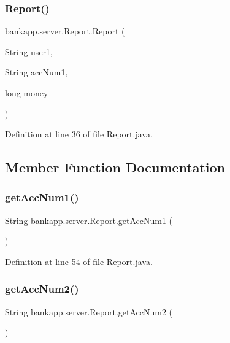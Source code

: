 \subsubsection{\texorpdfstring{Report()}{Report()}\hspace{0.1cm}{\footnotesize\ttfamily [3/3]}}
{\footnotesize\ttfamily bankapp.\+server.\+Report.\+Report (\begin{DoxyParamCaption}\item[{String}]{user1,  }\item[{String}]{acc\+Num1,  }\item[{long}]{money }\end{DoxyParamCaption})}



Definition at line 36 of file Report.\+java.



\subsection{Member Function Documentation}
\mbox{\label{classbankapp_1_1server_1_1_report_afe47b72f0f1624be2f77d0f573673fb3}} 
\subsubsection{\texorpdfstring{get\+Acc\+Num1()}{getAccNum1()}}
{\footnotesize\ttfamily String bankapp.\+server.\+Report.\+get\+Acc\+Num1 (\begin{DoxyParamCaption}{ }\end{DoxyParamCaption})}



Definition at line 54 of file Report.\+java.

\mbox{\label{classbankapp_1_1server_1_1_report_a4f31e0668d864a95c03b3435903ffc5d}} 
\subsubsection{\texorpdfstring{get\+Acc\+Num2()}{getAccNum2()}}
{\footnotesize\ttfamily String bankapp.\+server.\+Report.\+get\+Acc\+Num2 (\begin{DoxyParamCaption}{ }\end{DoxyParamCaption})}



